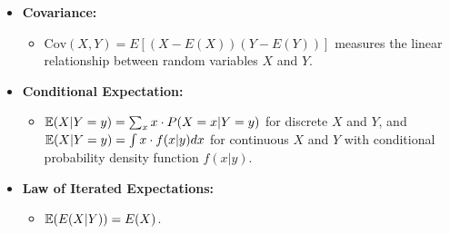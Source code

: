 \documentclass{article}
\begin{document}
\begin{itemize}
\begin{itemize}
        \item \textbf{Covariance:}
        \begin{itemize}
            \item $\text{Cov}(X, Y) = E[(X - E(X))(Y - E(Y))]$ measures the linear relationship between random variables $X$ and $Y$.
        \end{itemize}
        \item \textbf{Conditional Expectation:}
        \begin{itemize}
            \item ${\mathbb E}(X|Y=y) = \sum_{x} x \cdot P(X = x|Y = y)$ for discrete $X$ and $Y$, and ${\mathbb E}(X|Y=y) = \int x \cdot f(x|y) dx$ for continuous $X$ and $Y$ with conditional probability density function $f(x|y)$.
        \end{itemize}        
        \item \textbf{Law of Iterated Expectations:} 
        \begin{itemize}
            \item ${\mathbb E}(E(X|Y)) = E(X)$.
        \end{itemize}

    
    \end{itemize}
    

\end{itemize}



\end{document}
